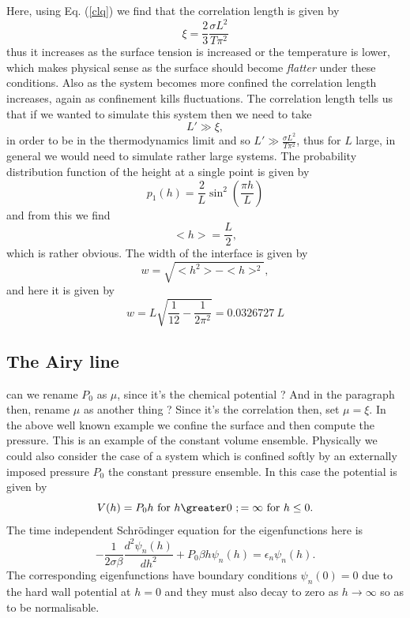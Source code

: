 Here, using Eq. (\ref{clq}) we find that  the correlation length is given by
\begin{equation}
    \xi = \frac{2}{3}\frac{\sigma L^2}{T\pi^2}
    \label{corel}
\end{equation}
thus it increases as the surface tension is increased or the temperature is lower, which makes physical sense as the surface should become {\em flatter} under these conditions. Also as the system becomes more confined the correlation length increases, again as  confinement  
kills fluctuations. The correlation length tells us that if we wanted to simulate this system then we need to take
\begin{equation}
    L'\gg \xi ,
\end{equation}
in order to be in the thermodynamics limit and so $L' \gg \frac{\sigma L^2}{T\pi^2}$, thus for 
$L$ large, in general we would need to simulate rather large systems.
The probability distribution function of the height at a single point is given by
\begin{equation}
    p_1(h) =\frac{2}{L}\sin^2(\frac{\pi h}{L})
\end{equation}
and from this we find 
\begin{equation}
    < h> = \frac{L}{2},  
\end{equation}
which is rather obvious. The width of the interface is given by 
\begin{equation}
    w=\sqrt{< h^2> - < h>^2},
\end{equation}
and here it is given by
\begin{equation}
    w= L\sqrt{\frac{1}{12}-\frac{1}{2\pi^2}}= 0.0326727\  L
\end{equation}


    \subsection{The Airy line}
{\color{red} can we rename $P_0$ as $\mu$, since it's the chemical potential ? And in the paragraph then, rename $\mu$ as another thing ? Since it's the correlation then, set $\mu = \xi$.}
In the  above well known example we confine the surface and then compute the pressure. This is an example of the constant volume ensemble. Physically we could also consider the case of a system which is confined softly by an externally imposed pressure $P_0$ the constant pressure ensemble. In this case the potential is given by
\begin{equation}
    V(h) = P_0 h \ {\rm for }\ h \greater 0\ ; =\infty \ {\rm for}\ h\leq 0. 
\end{equation}
The time independent Schr\"odinger equation for the eigenfunctions here is
\begin{equation}
    -\frac{1}{2\sigma\beta}\frac{d^2 \psi_n(h)}{dh^2} + P_0\beta h \psi_n(h) = \epsilon_n\psi_n(h).
\end{equation}
The corresponding eigenfunctions have boundary conditions $\psi_n(0)=0$ due to the hard wall potential at $h=0$ and they must also decay to zero as $h\to \infty$ so as to be normalisable.

